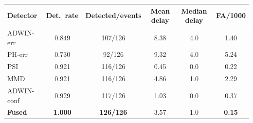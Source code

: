 \begin{tabular}{lccccc}
\toprule
Detector & Det.\ rate & Detected/events & Mean delay & Median delay & FA/1000 \\
\midrule
ADWIN-err  & 0.849 & 107/126 & 8.38 & 4.0 & 1.40 \\
PH-err     & 0.730 & 92/126  & 9.32 & 4.0 & 5.24 \\
PSI        & 0.921 & 116/126 & 0.45 & 0.0 & 0.22 \\
MMD        & 0.921 & 116/126 & 4.86 & 1.0 & 2.29 \\
ADWIN-conf & 0.929 & 117/126 & 1.03 & 0.0 & 0.37 \\
\textbf{Fused} & \textbf{1.000} & \textbf{126/126} & 3.57 & 1.0 & \textbf{0.15} \\
\bottomrule
\end{tabular}

